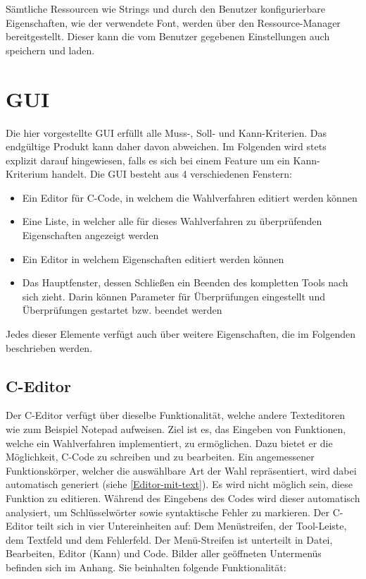 \documentclass[a4paper]{scrreprt}
\begin{document}
Sämtliche Ressourcen wie Strings und durch den Benutzer konfigurierbare Eigenschaften, wie der verwendete Font, werden über den Ressource-Manager bereitgestellt. Dieser kann die vom Benutzer gegebenen Einstellungen auch speichern und laden.

\chapter{GUI}
Die hier vorgestellte \ac{GUI} erfüllt alle Muss-, Soll- und Kann-Kriterien. Das endgültige Produkt kann daher davon abweichen. Im Folgenden wird stets explizit darauf hingewiesen, falls es sich bei einem Feature um ein Kann-Kriterium handelt.
Die \ac{GUI} besteht aus 4 verschiedenen Fenstern: 
\begin{itemize}
\item Ein Editor für C-Code, in welchem die Wahlverfahren editiert werden können
\item Eine Liste, in welcher alle für dieses Wahlverfahren zu überprüfenden Eigenschaften angezeigt werden
\item Ein Editor in welchem Eigenschaften editiert werden können
\item Das Hauptfenster, dessen Schließen ein Beenden des kompletten Tools nach sich zieht. Darin können Parameter für Überprüfungen eingestellt und Überprüfungen gestartet bzw. beendet werden
\end{itemize}
Jedes dieser Elemente verfügt auch über weitere Eigenschaften, die im Folgenden beschrieben werden.

\section{C-Editor}
Der C-Editor verfügt über dieselbe Funktionalität, welche andere Texteditoren wie zum Beispiel Notepad aufweisen. Ziel ist es, das Eingeben von Funktionen, welche ein Wahlverfahren implementiert, zu ermöglichen. Dazu bietet er die Möglichkeit, C-Code zu schreiben und zu bearbeiten. Ein angemessener Funktionskörper, welcher die auswählbare Art der Wahl repräsentiert, wird dabei automatisch generiert (siehe \ref{Editor-mit-text}). Es wird nicht möglich sein, diese Funktion zu editieren. Während des Eingebens des Codes wird dieser automatisch analysiert, um Schlüsselwörter sowie syntaktische Fehler zu markieren. 
Der C-Editor teilt sich in vier Untereinheiten auf: Dem Menüstreifen, der Tool-Leiste, dem Textfeld und dem Fehlerfeld. Der Menü-Streifen ist unterteilt in Datei, Bearbeiten, Editor (Kann) und Code. Bilder aller geöffneten Untermenüs befinden sich im Anhang. Sie beinhalten folgende Funktionalität:
\end{document}
